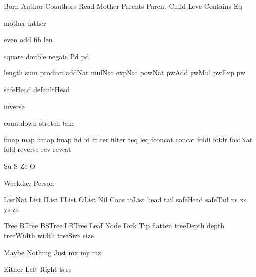 
\DefRel Born
\DefRel Author
\DefRel Coauthors
\DefRel Read
\DefRel Mother
\DefRel Parents
\DefRel Parent
\DefRel Child
\DefRel Love
\DefRel Contains
\DefRel Eq

\DefFun mother
\DefFun father

\DefFun even
\DefFun odd
\DefFun fib
\DefFun len

\DefFpf square
\DefFpf double
\DefFpf negate
\DefFPF Pd pd

\DefFpf length
\DefFpf sum
\DefFpf product
\DefFpf addNat
\DefFpf mulNat
\DefFpf expNat
\DefFpf powNat
\DefFpf pwAdd
\DefFpf pwMul
\DefFpf pwExp
\DefFpf pw

\DefFpf safeHead
\DefFpf defaultHead

\DefFpf inverse

\DefFpf countdown
\DefFpf stretch
\DefFpf take

\DefFPF fmap    map
\DefFPF ffmap   fmap
\DefFPF fid     id
\DefFPF ffilter filter
\DefFPF fleq    leq
\DefFPF fconcat concat
\DefFpf foldl
\DefFpf foldr
\DefFpf foldNat
\DefFpf fold
\DefFpf reverse
\DefFpf rev
\DefFpf revcat

\DefCONS Su S
\DefCONS Ze O

\DefType Weekday
\DefType Person

\DefType ListNat
\DefType List
\DefType IList
\DefType EList
\DefType OList
\DefCons Nil
\DefCons Cons
\DefFpf  toList
\DefFpf  head
\DefFpf  tail
\DefFpf  safeHead
\DefFpf  safeTail
\DefVar  ns
\DefVar  xs
\DefVar  ys
\DefVar  zs

\DefType Tree
\DefType BTree
\DefType BSTree
\DefType LBTree
\DefCons Leaf
\DefCons Node
\DefCons Fork
\DefCons Tip
\DefFpf  flatten
\DefFPF  treeDepth  depth
\DefFPF  treeWidth  width
\DefFPF  treeSize   size

\DefType Maybe
\DefCons Nothing
\DefCons Just
\DefVar  mx
\DefVar  my
\DefVar  mz

\DefType Either
\DefCons Left
\DefCons Right
\DefVar  ls
\DefVar  rs

\def\bla{\mathrm{bla}}
\def\blu{\mathrm{blu}}

\def\persons{{\cal P}}
\let\pers=\persons

\def\euclid{\algorithmstylize{Euclid}}%

\def\Smile{\rel{\woohoo}}
\def\Frown{\rel{\boohoo}}

\def\oddAs#1{A_{[#1]}}

